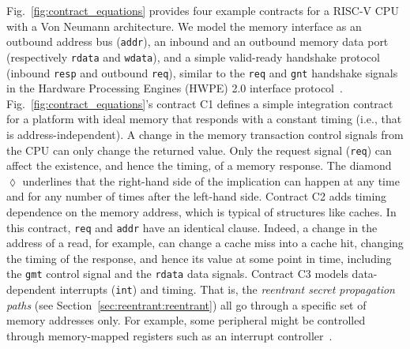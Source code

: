 Fig.~\ref{fig:contract_equations} provides four example contracts for a RISC-V CPU with a Von Neumann architecture.
We model the memory interface as an outbound address bus (\texttt{addr}), an inbound and an outbound memory data port (respectively \texttt{rdata} and \texttt{wdata}), and a simple valid-ready handshake protocol (inbound \texttt{resp} and outbound \texttt{req}), similar to the \texttt{req} and \texttt{gnt} handshake signals in the Hardware Processing Engines (HWPE) 2.0 interface protocol~\cite{pulpHWPEMem}.
Fig.~\ref{fig:contract_equations}'s contract C1 defines a simple integration contract for a platform with ideal memory that responds with a constant timing (i.e., that is address-independent).
A change in the memory transaction control signals from the CPU can only change the returned value.
Only the request signal (\texttt{req}) can affect the existence, and hence the timing, of a memory response.
The diamond $\lozenge$ underlines that the right-hand side of the implication can happen at any time and for any number of times after the left-hand side.
Contract C2 adds timing dependence on the memory address, which is typical of structures like caches.
In this contract, \texttt{req} and \texttt{addr} have an identical clause. Indeed, a change in the address of a read, for example, can change a cache miss into a cache hit, changing the timing of the response, and hence its value at some point in time, including the \texttt{gmt} control signal and the \texttt{rdata} data signals.
Contract C3 models data-dependent interrupts (\texttt{int}) and timing.
That is, the \emph{reentrant secret propagation paths} (see Section~\ref{sec:reentrant:reentrant}) all go through a specific set of memory addresses only.
For example, some peripheral might be controlled through memory-mapped registers such as an interrupt controller~\cite{riscv_plic_spec_1_0_0}.

